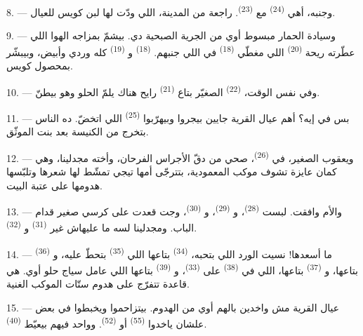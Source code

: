 8. --- وجنبه، أهي  \textsuperscript{(24)} مع 
\textsuperscript{(23)}. راجعة من المدينة، اللي ودّت لها لبن كويس للعيال.

\VUsaut{4.0mm}
\VUsaut{3.4mm}

9. --- وسيادة الحمار مبسوط أوي من الجرية الصبحية دي. بيشمّ بمزاجه الهوا اللي
عطّرته ريحة  \textsuperscript{(20)} اللي مغطّي 
\textsuperscript{(18)} في  اللي جنبهم. 
\textsuperscript{(18)} و \textsuperscript{(19)} كله وردي وأبيض،
وبيبشّر بمحصول كويس.

10. --- وفي نفس الوقت،  \textsuperscript{(22)} الصغيّر بتاع
 \textsuperscript{(21)} رايح هناك يلمّ  الحلو وهو بيطنّ.

11. --- بس في إيه؟ أهم عيال القرية جايين بيجروا وبيهرّبوا 
\textsuperscript{(25)} اللي اتخضّ. ده الناس بتخرج من الكنيسة بعد 
بنت الموثّق.

12. --- ويعقوب الصغير، في  \textsuperscript{(26)}، صحي من دقّ الأجراس
الفرحان، وأخته مجدلينا، وهي كمان عايزة تشوف موكب المعمودية، بتترجّى أمها
تيجي تمشّط لها شعرها وتلبّسها هدومها على عتبة البيت.

13. --- والأم وافقت. لبست  \textsuperscript{(28)}،
و \textsuperscript{(29)}، و \textsuperscript{(30)}، وجت
قعدت على كرسي صغير قدام الباب. ومجدلينا لسه ما عليهاش غير
 \textsuperscript{(31)} و \textsuperscript{(32)}.

14. --- ما أسعدها! نسيت الورد اللي بتحبه،  \textsuperscript{(34)}
بتاعها اللي  \textsuperscript{(35)} بتحطّ عليه، و
\textsuperscript{(36)} بتاعها، و \textsuperscript{(37)} بتاعها، اللي
في  \textsuperscript{(38)} على  \textsuperscript{(33)}،
و \textsuperscript{(39)} بتاعها اللي عامل سياج حلو أوي. هي قاعدة
تتفرّج على هدوم ستّات الموكب الغنية.

15. --- عيال القرية مش واخدين بالهم أوي من الهدوم. بيتزاحموا ويخبطوا في بعض
علشان ياخدوا  \textsuperscript{(55)} أو 
\textsuperscript{(52)}. وواحد فيهم بيعيّط \textsuperscript{(40)}.

